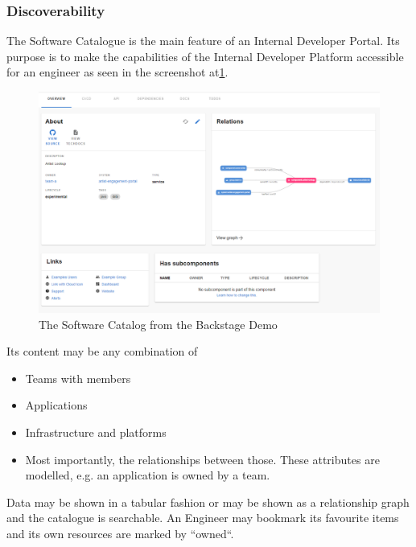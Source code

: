 \documentclass[a4paper,12pt]{article}
\begin{document}
    \subsubsection{Discoverability}
    The Software Catalogue is the main feature of an Internal Developer Portal.
    Its purpose is to make the capabilities of the Internal Developer Platform accessible for an engineer as seen in the
    screenshot at\ref{fig:catalog}.

    \begin{figure}
        \includegraphics[width=\linewidth]{backstage_item_details}
        \caption{The Software Catalog from the Backstage Demo\parencite{backstagedemo}}
        \label{fig:catalog}
    \end{figure}
    Its content may be any combination of
    \begin{itemize}
        \item Teams with members
        \item Applications
        \item Infrastructure and platforms
        \item Most importantly, the relationships between those. These attributes are modelled, e.g. an application is owned by a team.
    \end{itemize}
    Data may be shown in a tabular fashion or may be shown as a relationship graph and the catalogue is searchable.
    An Engineer may bookmark its favourite items and its own resources are marked by ``owned``.
\end{document}

